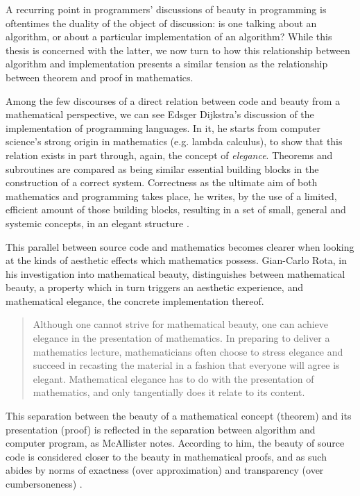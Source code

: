 A recurring point in programmers' discussions of beauty in programming is oftentimes the duality of the object of discussion: is one talking about an algorithm, or about a particular implementation of an algorithm? While this thesis is concerned with the latter, we now turn to how this relationship between algorithm and implementation presents a similar tension as the relationship between theorem and proof in mathematics.

Among the few discourses of a direct relation between code and beauty from a mathematical perspective, we can see Edsger Dijkstra's discussion of the implementation of programming languages. In it, he starts from computer science's strong origin in mathematics (e.g. lambda calculus), to show that this relation exists in part through, again, the concept of \emph{elegance}. Theorems and subroutines are compared as being similar essential building blocks in the construction of a correct system. Correctness as the ultimate aim of both mathematics and programming takes place, he writes, by the use of a limited, efficient amount of those building blocks, resulting in a set of small, general and systemic concepts, in an elegant structure \citep{dijkstra_design_1963}.

This parallel between source code and mathematics becomes clearer when looking at the kinds of aesthetic effects which mathematics possess. Gian-Carlo Rota, in his investigation into mathematical beauty, distinguishes between mathematical beauty, a property which in turn triggers an aesthetic experience, and mathematical elegance, the concrete implementation thereof.

\begin{quote}
  Although one cannot strive for mathematical beauty, one can achieve elegance in the presentation of mathematics. In preparing to deliver a mathematics lecture, mathematicians often choose to stress elegance and succeed in recasting the material in a fashion that everyone will agree is elegant. Mathematical elegance has to do with the presentation of mathematics, and only tangentially does it relate to its content. \citep{rota_phenomenology_1997}
\end{quote}

This separation between the beauty of a mathematical concept (theorem) and its presentation (proof) is reflected in the separation between algorithm and computer program, as McAllister notes. According to him, the beauty of source code is considered closer to the beauty in mathematical proofs, and as such abides by norms of exactness (over approximation) and transparency (over cumbersoneness) \citep{mcallister_mathematical_2005}.

